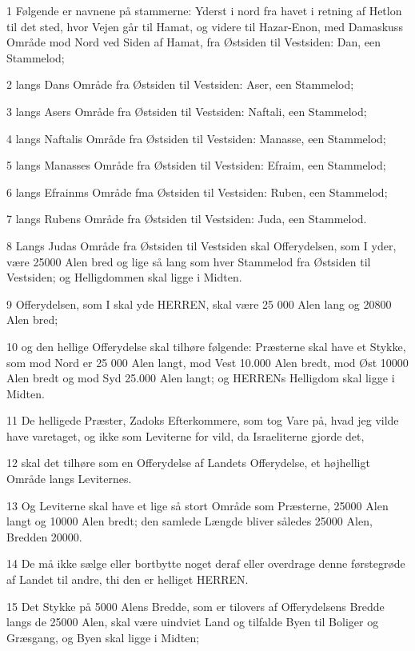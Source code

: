 \par 1 Følgende er navnene på stammerne: Yderst i nord fra havet i retning af Hetlon til det sted, hvor Vejen går til Hamat, og videre til Hazar-Enon, med Damaskuss Område mod Nord ved Siden af Hamat, fra Østsiden til Vestsiden: Dan, een Stammelod;
\par 2 langs Dans Område fra Østsiden til Vestsiden: Aser, een Stammelod;
\par 3 langs Asers Område fra Østsiden til Vestsiden: Naftali, een Stammelod;
\par 4 langs Naftalis Område fra Østsiden til Vestsiden: Manasse, een Stammelod;
\par 5 langs Manasses Område fra Østsiden til Vestsiden: Efraim, een Stammelod;
\par 6 langs Efrainms Område fma Østsiden til Vestsiden: Ruben, een Stammelod;
\par 7 langs Rubens Område fra Østsiden til Vestsiden: Juda, een Stammelod.
\par 8 Langs Judas Område fra Østsiden til Vestsiden skal Offerydelsen, som I yder, være 25000 Alen bred og lige så lang som hver Stammelod fra Østsiden til Vestsiden; og Helligdommen skal ligge i Midten.
\par 9 Offerydelsen, som I skal yde HERREN, skal være 25 000 Alen lang og 20800 Alen bred;
\par 10 og den hellige Offerydelse skal tilhøre følgende: Præsterne skal have et Stykke, som mod Nord er 25 000 Alen langt, mod Vest 10.000 Alen bredt, mod Øst 10000 Alen bredt og mod Syd 25.000 Alen langt; og HERRENs Helligdom skal ligge i Midten.
\par 11 De helligede Præster, Zadoks Efterkommere, som tog Vare på, hvad jeg vilde have varetaget, og ikke som Leviterne for vild, da Israeliterne gjorde det,
\par 12 skal det tilhøre som en Offerydelse af Landets Offerydelse, et højhelligt Område langs Leviternes.
\par 13 Og Leviterne skal have et lige så stort Område som Præsterne, 25000 Alen langt og 10000 Alen bredt; den samlede Længde bliver således 25000 Alen, Bredden 20000.
\par 14 De må ikke sælge eller bortbytte noget deraf eller overdrage denne førstegrøde af Landet til andre, thi den er helliget HERREN.
\par 15 Det Stykke på 5000 Alens Bredde, som er tilovers af Offerydelsens Bredde langs de 25000 Alen, skal være uindviet Land og tilfalde Byen til Boliger og Græsgang, og Byen skal ligge i Midten;
